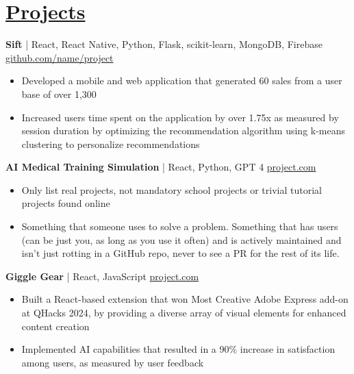 

\section*{\href{https://www.reddit.com/r/EngineeringResumes/wiki/index\#wiki_projects}{Projects}}
\textbf{Sift} | React, React Native, Python, Flask, scikit-learn, MongoDB, Firebase \hfill \href{http://github.com/name/project}{github.com/name/project} \\
\vspace{-9pt}
\begin{itemize}
  \item Developed a mobile and web application that generated 60 sales from a user base of over 1,300
  \item Increased users\textquotesingle $ $ time spent on the application by over 1.75x as measured by session duration by optimizing the recommendation algorithm using k-means clustering to personalize recommendations
\end{itemize}

\textbf{AI Medical Training Simulation} | React, Python, GPT 4 \hfill \href{http://project.com}{project.com} \\
\vspace{-9pt}
\begin{itemize}
  \item Only list real projects, not mandatory school projects or trivial tutorial projects found online 
  \item Something that someone uses to solve a problem. Something that has users (can be just you, as long as you use it often) and is actively maintained and isn't just rotting in a GitHub repo, never to see a PR for the rest of its life. 
\end{itemize}

\textbf{Giggle Gear} | React, JavaScript \hfill \href{http://project.com}{project.com} \\
\vspace{-9pt}
\begin{itemize}
  \item Built a React-based extension that won Most Creative Adobe Express add-on at QHacks 2024, by providing a diverse array of visual elements for enhanced content creation
  \item Implemented AI capabilities that resulted in a 90\% increase in satisfaction among users, as measured by user feedback
\end{itemize}

\vspace{-18.5pt}